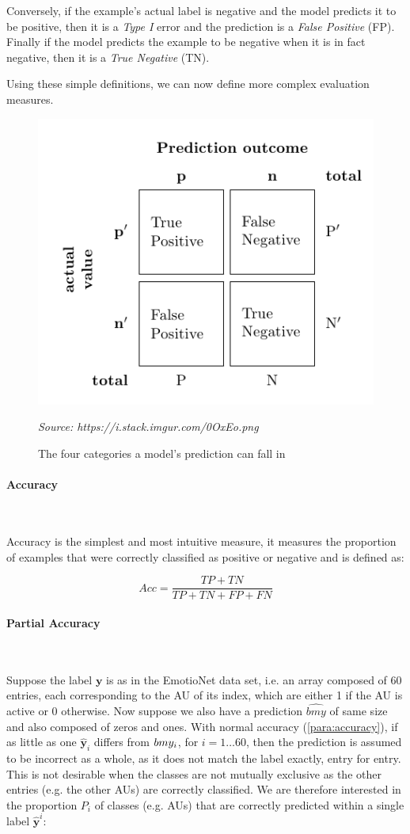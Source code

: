 \documentclass[12pt,twoside]{article}
\newcommand{\source}[1]{\vspace{-3pt} \caption*{ \footnotesize{\textit{Source: {#1}}}} }
\newcommand{\para}[1]{\paragraph{#1}\mbox{}\\}
\begin{document}
Conversely, if the example's actual label is negative and the model predicts
it to be positive, then it is a \textit{Type I} error and the prediction is a
\textit{False Positive} (FP). Finally if the model predicts the example to be
negative when it is in fact negative, then it is a \textit{True Negative}
(TN).

Using these simple definitions, we can now define more complex evaluation
measures.

\begin{figure}[ht]
  \centering
  \includegraphics[scale=0.7]{figures/tf_pos_neg.png}
  \caption{The four categories a model's prediction can fall in}
  \source{https://i.stack.imgur.com/0OxEo.png}
  \label{fig:tf_pos_neg}
\end{figure}

\para{Accuracy}\label{para:accuracy}

Accuracy is the simplest and most intuitive measure, it measures the proportion
of examples that were correctly classified as positive or negative and is
defined as:

\begin{equation}
  Acc = \frac{TP + TN}{TP + TN + FP + FN}
  \label{eq:accuracy}
\end{equation}

\para{Partial Accuracy}\label{para:partial_accuracy}

Suppose the label $\bm{y}$ is as in the EmotioNet data set, i.e. an array composed of 60
entries, each corresponding to the AU of its index, which are either 1 if the
AU is active or 0 otherwise. Now suppose we also have a prediction
$\hat{bm{y}}$ of same size and also composed of zeros and ones. With normal
accuracy (\ref{para:accuracy}), if as little as one $\hat{\bm{y}}_i$ differs
from $\\bm{y}_i$, for $i=1 \dots 60$, then the prediction is assumed to be
incorrect as a whole, as it does not match the label exactly, entry for entry.
This is not desirable when the classes are not mutually exclusive as the other
entries (e.g. the other AUs) are correctly classified. We are therefore
interested in the proportion $P_i$ of classes (e.g. AUs) that are correctly
predicted within a single label $\hat{\bm{y}}^i$:
\end{document}
